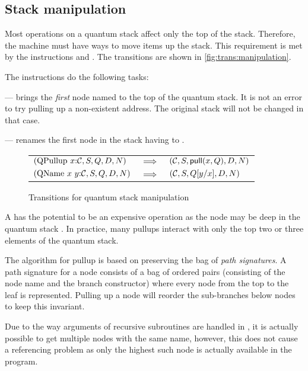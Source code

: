 \subsection{Stack manipulation}\label{subsec:stackmanipulation}
Most operations on a quantum stack affect only the top of the stack.
 Therefore,  the machine must have
 ways to move items up the stack. This requirement is met by the instructions
 and . The transitions are shown in 
\vref{fig:trans:manipulation}.

The instructions do the following tasks:
\begin{description}
\item{} --- brings the \emph{first} node named 
 to the top of the quantum stack. 
It is not an error to try pulling up a non-existent address. The original
stack will not be changed in that case.
\item{} --- renames the first
node in the stack having  
to .
\end{description}

\begin{figure}[htbp]
\begin{tabular}{lll}
$(\mathrm{QPullup}\ x{:}\mathcal{C},S,Q,D,N) $&$\implies$&$ (\mathcal{C},S,\mathrm{\textsf{pull}}(x,Q),D,N)$ \\[12pt]
$(\mathrm{QName}\ x\ y{:}\mathcal{C},S,Q,D,N) $&$\implies$&$ (\mathcal{C},S,Q[y/x],D,N)$ 
\end{tabular}
\caption{Transitions for quantum stack manipulation}\label{fig:trans:manipulation}
\end{figure}

A  has the potential to be
an expensive operation as the node  may be 
deep in the quantum stack . In practice, many
 pullups interact  with only the top two or three elements of the
quantum stack.

The algorithm for pullup is based on preserving the bag of 
\emph{path signatures}.  A {path signature} for a node
consists of a bag of ordered pairs (consisting of the node name and
the branch constructor) where
every node from the top to the leaf is represented. 
Pulling up a
node will reorder the sub-branches below nodes to keep this invariant.

Due to the way  arguments of recursive subroutines are handled in \lqpl,
it is actually possible to get multiple nodes with the same name, however, this
does not cause a referencing problem as only the highest such node is actually
available in the \lqpl{} program.

